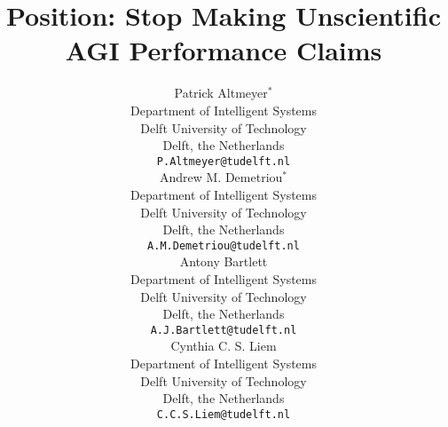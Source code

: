 \documentclass{article}
\theoremstyle{plain}
\theoremstyle{definition}
\theoremstyle{remark}
\begin{document}
\title{Position: Stop Making Unscientific AGI Performance Claims}

\author{
    Patrick Altmeyer$^\ast$ \\
    Department of Intelligent Systems \\ 
    Delft University of Technology \\ 
    Delft, the Netherlands \\
	\texttt{P.Altmeyer@tudelft.nl} \\
	\And
    Andrew M. Demetriou$^\ast$ \\
    Department of Intelligent Systems \\ 
    Delft University of Technology \\ 
    Delft, the Netherlands \\
	\texttt{A.M.Demetriou@tudelft.nl} \\
	\And
    Antony Bartlett \\
    Department of Intelligent Systems \\ 
    Delft University of Technology \\ 
    Delft, the Netherlands \\
	\texttt{A.J.Bartlett@tudelft.nl} \\
	\And
    Cynthia C. S. Liem \\
    Department of Intelligent Systems \\ 
    Delft University of Technology \\ 
    Delft, the Netherlands \\
	\texttt{C.C.S.Liem@tudelft.nl} \\
}

\maketitle
\def\thefootnote{*}\def\thefootnote{\arabic{footnote}}


\vskip 0.3in

\begin{abstract}

\end{abstract}

\twocolumn


\end{document}
